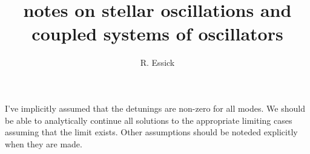 \documentclass[10pt]{report}
\title{notes on stellar oscillations and coupled systems of oscillators}
\author{R. Essick}
\begin{document}
\maketitle

I've implicitly assumed that the detunings are non-zero for all modes. We should be able to analytically continue all solutions to the appropriate limiting cases assuming that the limit exists. Other assumptions should be noteded explicitly when they are made.
















\end{document}
